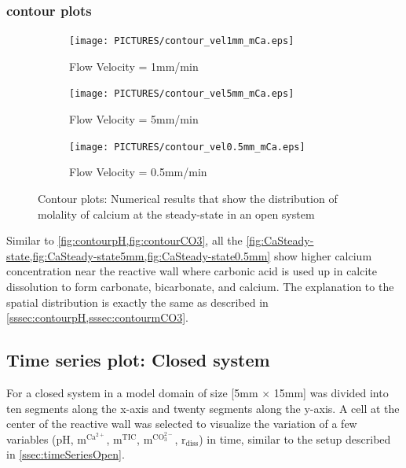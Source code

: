 \subsubsection*{ contour plots} \label{sssec:contourmCa}

\begin{figure}[!h]
\centering
    \begin{subfigure}{.5\linewidth}
        \centering
        \texttt{[image: PICTURES/contour\_vel1mm\_mCa.eps]}
        \caption{Flow Velocity = 1mm/min}
        \label{fig:CaSteady-state}       %
    \end{subfigure}%
    \hfill
    \begin{subfigure}{.5\linewidth}
        \centering
        \texttt{[image: PICTURES/contour\_vel5mm\_mCa.eps]}
        \caption{Flow Velocity = 5mm/min}
        \label{fig:CaSteady-state5mm}       %
    \end{subfigure}%
    \hfill
    \begin{subfigure}{.5\linewidth}
        \centering
        \texttt{[image: PICTURES/contour\_vel0.5mm\_mCa.eps]}
        \caption{Flow Velocity = 0.5mm/min}
        \label{fig:CaSteady-state0.5mm}       %
    \end{subfigure}%
    \caption{\DuMuX Contour plots: Numerical results that show the distribution of molality of calcium at the steady-state in an open system}
     \label{fig:contourCa}
\end{figure}

Similar to \cref{fig:contourpH,fig:contourCO3}, all the \cref{fig:CaSteady-state,fig:CaSteady-state5mm,fig:CaSteady-state0.5mm} show higher 
calcium concentration near the reactive wall where carbonic acid is used up in calcite dissolution to form carbonate, bicarbonate, and calcium. 
The explanation to the spatial distribution is exactly the same as described in \cref{sssec:contourpH,sssec:contourmCO3}.


\subsection{Time series plot: Closed system} \label{ssec:timeSeriesClosed}
For a closed system in \DuMuX a model domain of size [5mm $\times$ 15mm] was divided into ten segments along the x-axis and twenty segments along the y-axis.
A cell at the center of the reactive wall was selected to visualize the variation of a few variables (pH, $\mathrm{m^{Ca^{2+}}}$, $\mathrm{m^{TIC}}$, 
$\mathrm{m^{CO_3^{2-}}}$, $\mathrm{r_{diss}}$) in time, similar to the setup described in \cref{ssec:timeSeriesOpen}.

